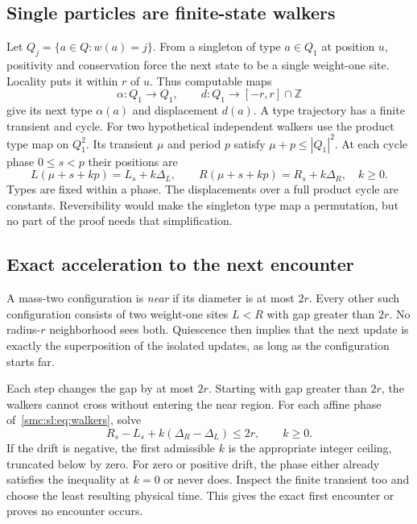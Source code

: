 \documentclass[11pt,letterpaper]{article}
\numberwithin{equation}{section}
\theoremstyle{definition}
\theoremstyle{remark}
\newcommand{\Z}{\mathbb Z}
\begin{document}
\subsection{Single particles are finite-state walkers}
Let $Q_j=\{a\in Q:w(a)=j\}$. From a singleton of type $a\in Q_1$ at position $u$, positivity and conservation force the next state to be a single weight-one site. Locality puts it within $r$ of $u$. Thus computable maps
\[
 \alpha:Q_1\to Q_1,\qquad d:Q_1\to[-r,r]\cap\Z
\]
give its next type $\alpha(a)$ and displacement $d(a)$. A type trajectory has a finite transient and cycle. For two hypothetical independent walkers use the product type map on $Q_1^2$. Its transient $\mu$ and period $p$ satisfy $\mu+p\le |Q_1|^2$. At each cycle phase $0\le s<p$ their positions are
\begin{equation}\label{smc:sl:eq:walkers}
 L(\mu+s+kp)=L_s+k\Delta_L,\qquad
 R(\mu+s+kp)=R_s+k\Delta_R,\quad k\ge0.
\end{equation}
Types are fixed within a phase. The displacements over a full product cycle are constants. Reversibility would make the singleton type map a permutation, but no part of the proof needs that simplification.

\subsection{Exact acceleration to the next encounter}
A mass-two configuration is \emph{near} if its diameter is at most $2r$. Every other such configuration consists of two weight-one sites $L<R$ with gap greater than $2r$. No radius-$r$ neighborhood sees both. Quiescence then implies that the next update is exactly the superposition of the isolated updates, as long as the configuration starts far.

Each step changes the gap by at most $2r$. Starting with gap greater than $2r$, the walkers cannot cross without entering the near region. For each affine phase of~\eqref{smc:sl:eq:walkers}, solve
\begin{equation}\label{smc:sl:eq:encounter}
 R_s-L_s+k(\Delta_R-\Delta_L)\le2r,\qquad k\ge0.
\end{equation}
If the drift is negative, the first admissible $k$ is the appropriate integer ceiling, truncated below by zero. For zero or positive drift, the phase either already satisfies the inequality at $k=0$ or never does. Inspect the finite transient too and choose the least resulting physical time. This gives the exact first encounter or proves no encounter occurs.
\end{document}
